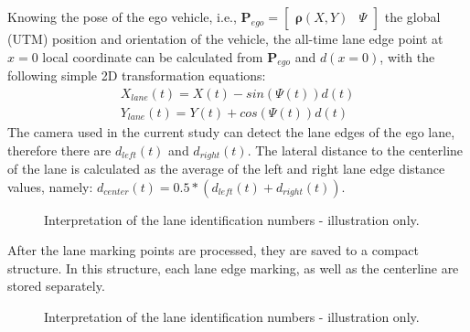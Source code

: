\documentclass[sn-mathphys-num]{sn-jnl}%
\begin{document}
Knowing the pose of the ego vehicle, i.e., $\boldsymbol{P}_{ego} = \begin{bmatrix}
    \boldsymbol{\rho}(X,Y) & \Psi
\end{bmatrix}$ the global (UTM) position and orientation of the vehicle, the all-time lane edge 
point at $x=0$ local coordinate can be calculated from $\boldsymbol{P}_{ego}$ and $d(x=0)$, with the following simple 2D transformation equations:
\begin{align} \label{eq:2DTransform}
    X_{lane}(t) = X(t) - sin(\Psi(t))d(t) \\
    Y_{lane}(t) = Y(t) + cos(\Psi(t))d(t)
\end{align}
The camera used in the current study can detect the lane edges of the ego lane, therefore there are $d_{left}(t)$ and $d_{right}(t)$. The lateral distance to the 
centerline of the lane is calculated as the average of the left and right lane edge distance values, namely: $d_{center}(t) = 0.5*(d_{left}(t)+d_{right}(t))$.
\begin{figure}[h]
    \caption{Interpretation of the lane identification numbers - illustration only.}
    \label{fig:idInterpretation}
\end{figure}
\newline
After the lane marking points are processed, they are saved to a compact structure. In this structure, each lane edge marking, as well as the centerline are stored 
separately. 
\begin{figure}[h]
    \caption{Interpretation of the lane identification numbers - illustration only.}
    \label{fig:idInterpretation}
\end{figure}
\newline
\newline
{}
\end{document}
